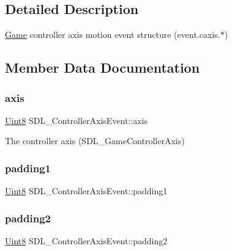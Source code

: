 \subsection{Detailed Description}
\mbox{\hyperlink{class_game}{Game}} controller axis motion event structure (event.\+caxis.$\ast$) 

\subsection{Member Data Documentation}
\mbox{\label{struct_s_d_l___controller_axis_event_aba6543c143521aebce06a41a8cf79db0}} 
\subsubsection{\texorpdfstring{axis}{axis}}
{\footnotesize\ttfamily \mbox{\hyperlink{_s_d_l__stdinc_8h_a2944638813a090aa23e62f4da842c3e2}{Uint8}} S\+D\+L\+\_\+\+Controller\+Axis\+Event\+::axis}

The controller axis (S\+D\+L\+\_\+\+Game\+Controller\+Axis) \mbox{\label{struct_s_d_l___controller_axis_event_af980495b1e24f9a868f2ccb25ce9629b}} 
\subsubsection{\texorpdfstring{padding1}{padding1}}
{\footnotesize\ttfamily \mbox{\hyperlink{_s_d_l__stdinc_8h_a2944638813a090aa23e62f4da842c3e2}{Uint8}} S\+D\+L\+\_\+\+Controller\+Axis\+Event\+::padding1}

\mbox{\label{struct_s_d_l___controller_axis_event_a4a04fcd20a54db21c5258ab0e40c6ab5}} 
\subsubsection{\texorpdfstring{padding2}{padding2}}
{\footnotesize\ttfamily \mbox{\hyperlink{_s_d_l__stdinc_8h_a2944638813a090aa23e62f4da842c3e2}{Uint8}} S\+D\+L\+\_\+\+Controller\+Axis\+Event\+::padding2}

